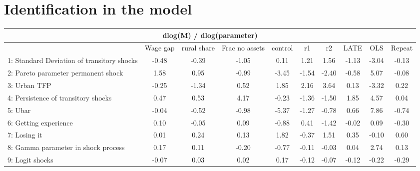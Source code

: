 \documentclass[pdftex,11pt]{article}
\renewcommand{\arraystretch}{.7}
\begin{document}
\section{Identification in the model}


\newpage

\begin{landscape}
\centering
\begin{table}
\footnotesize
\setlength {\tabcolsep}{3.5mm}
\renewcommand{\arraystretch}{2.25}
\begin{center}\label{tb:employment}
\begin{tabular}{l c c c c c c c c c}  
\multicolumn{10}{c}{dlog(M) / dlog(parameter)} \\
\hline
\hline
&  Wage gap & rural share &  Frac no assets & control & r1 & r2 & LATE & OLS & Repeat \\
1: Standard Deviation of transitory shocks&    -0.48   &  -0.39   &  -1.05  &   0.11  &   1.21 &   1.56  &   -1.13  & -3.04 &   -0.13\\
2: Pareto parameter permanent shock       &     1.58   &   0.95   &  -0.99  &  -3.45  &  -1.54 &  -2.40  &   -0.58  &  5.07 &   -0.08\\
3: Urban TFP                              &    -0.25   &  -1.34   &   0.52  &   1.85  &   2.16 &   3.64  &    0.13  & -3.32 &    0.22\\
4: Persistence of transitory shocks       &     0.47   &   0.53   &   4.17  &  -0.23  &  -1.36 &  -1.50  &    1.85  &  4.57 &    0.04\\
5: Ubar                                   &    -0.04   &  -0.52   &  -0.98  &  -5.37  &  -1.27 &  -0.78  &    0.66  &  7.86 &   -0.74\\
6: Getting experience                     &     0.10   &  -0.05   &   0.09  &  -0.88  &   0.41 &  -1.42  &   -0.02  &  0.09 &   -0.30\\
7: Losing it                              &     0.01   &   0.24   &   0.13  &   1.82  &  -0.37 &   1.51  &    0.35  & -0.10 &    0.60\\
8: Gamma parameter in shock process       &     0.17   &   0.11   &  -0.20  &  -0.77  &  -0.11 &  -0.03  &    0.04  &  2.74 &    0.13\\
9: Logit shocks                           &    -0.07   &   0.03   &   0.02  &   0.17  &  -0.12 &  -0.07  &   -0.12  & -0.22 &   -0.29\\ 
\hline
\hline
\end{tabular}
\end{center}
\end{table}

\end{landscape}
\end{document}
